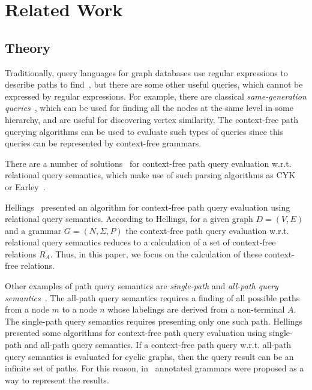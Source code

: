 \section{Related Work}
\label{section_related}
\subsection{Theory}
Traditionally, query languages for graph databases use regular expressions to describe paths to find~\cite{reutter2017regular,fan2011adding,abiteboul1997regular,nole2016regular,graphDB}, but there are some other useful queries, which cannot be expressed by regular expressions. For example, there are classical \emph{same-generation queries}~\cite{FndDB}, which can be used for finding all the nodes at the same level in some hierarchy, and are useful for discovering vertex similarity. The context-free path querying algorithms can be used to evaluate such types of queries since this queries can be represented by context-free grammars.  

There are a number of solutions~\cite{hellingsRelational,GraphQueryWithEarley,RDF} for context-free path query evaluation w.r.t. relational query semantics, which make use of such parsing algorithms as CYK~\cite{kasami,younger} or Earley~\cite{Grune}.

Hellings~\cite{hellingsRelational} presented an algorithm for context-free path query evaluation using relational query semantics. According to Hellings, for a given graph \mbox{$D = (V, E)$} and a grammar $G = (N, \Sigma, P)$ the context-free path query evaluation w.r.t. relational query semantics reduces to a calculation of a set of context-free relations $R_A$. Thus, in this paper, we focus on the calculation of these context-free relations. 

Other examples of path query semantics are \emph{single-path} and \emph{all-path query semantics}~\cite{hellingsPathQuerying}. The all-path query semantics requires a finding of all possible paths from a node $m$ to a node $n$ whose labelings are derived from a non-terminal $A$. The single-path query semantics requires presenting only one such path. Hellings~\cite{hellingsPathQuerying} presented some algorithms for context-free path query evaluation using single-path and all-path query semantics. If a context-free path query w.r.t. all-path query semantics is evaluated for cyclic graphs, then the query result can be an infinite set of paths. For this reason, in~\cite{hellingsPathQuerying} annotated grammars were proposed as a way to represent the results.

